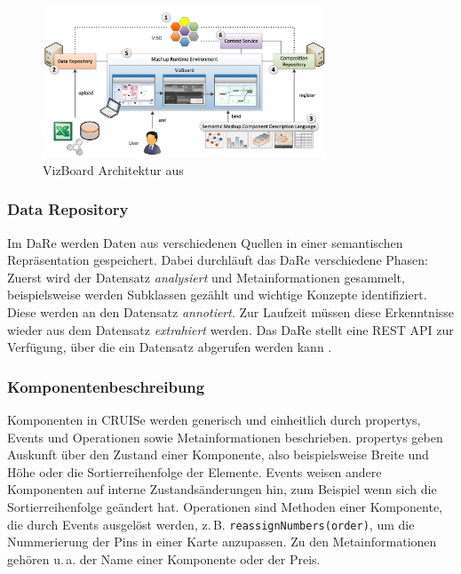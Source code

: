 \documentclass[
	headsepline,
	footsepline,
	fontsize=12pt,
	bibliography=totoc
]{scrbook}
\begin{document}
\begin{figure}[htbp]
	\centering
	\includegraphics[width=0.75\textwidth]{images/grundlagen-vizboard_architektur.png}
	\caption{VizBoard Architektur aus \cite{Voigt2013}}
	\label{figure:vizboard_architektur}
\end{figure}

\subsubsection{Data Repository}
\label{section:standderforschung_data_repository}

Im DaRe werden Daten aus verschiedenen Quellen in einer semantischen Repräsentation gespeichert. Dabei durchläuft das DaRe verschiedene Phasen: Zuerst wird der Datensatz \emph{analysiert} und Metainformationen gesammelt, beispielsweise werden Subklassen gezählt und wichtige Konzepte identifiziert. Diese werden an den Datensatz \emph{annotiert}. Zur Laufzeit müssen diese Erkenntnisse wieder aus dem Datensatz \emph{extrahiert} werden. Das DaRe stellt eine REST API zur Verfügung, über die ein Datensatz abgerufen werden kann \cite{Piccolotto2012}.

\subsubsection{Komponentenbeschreibung}
\label{section:standderforschung:grundlagen:cruise_vizboard:komponentenbeschreibung}

Komponenten in CRUISe werden generisch und einheitlich durch propertys, Events und Operationen sowie Metainformationen beschrieben. propertys geben Auskunft über den Zustand einer Komponente, also beispielsweise Breite und Höhe oder die Sortierreihenfolge der Elemente. Events weisen andere Komponenten auf interne Zustandsänderungen hin, zum Beispiel wenn sich die Sortierreihenfolge geändert hat. Operationen sind Methoden einer Komponente, die durch Events ausgelöst werden, z.\,B. \texttt{reassignNumbers(order)}, um die Nummerierung der Pins in einer Karte anzupassen. Zu den Metainformationen gehören u.\,a. der Name einer Komponente oder der Preis.
\end{document}

